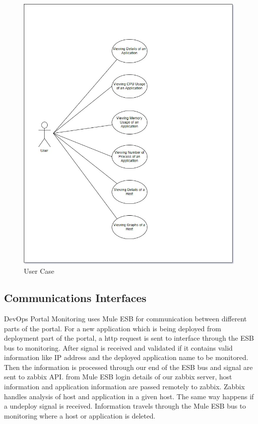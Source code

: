 \documentclass{article}
\begin{document}
\begin{figure}[H]
	\centering
	\includegraphics[scale=0.3,width=\linewidth]{pasted}
	\caption{User Case }
\end{figure}
\subsection{Communications Interfaces}

DevOps Portal Monitoring uses Mule ESB for communication between different parts of the portal. For a new application which is being deployed from deployment part of the portal, a http request is sent to interface through the ESB bus to monitoring. After signal is received and validated if it contains valid information like IP address and the deployed application name to be monitored. Then the information is processed through our end of the ESB bus and signal are sent to zabbix API. from Mule ESB login details of our zabbix server, host information and application information are passed remotely to zabbix. Zabbix handles analysis of host and application in a given host. The same way happens if a undeploy signal is received. Information travels through the Mule ESB bus to monitoring where a host or application is deleted.
\end{document}
